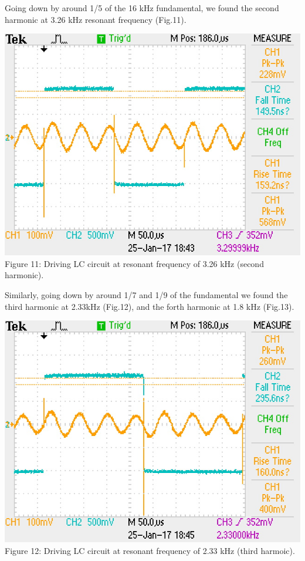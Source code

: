 \documentclass[]{article}
\begin{document}
		Going down by around 1/5 of the 16 kHz fundamental, we found the second harmonic at 3.26 kHz resonant frequency (Fig.11).
			\begin{center}
				\includegraphics[scale=0.8]{e_33hz}\\
				Figure 11: Driving LC circuit at resonant frequency of 3.26 kHz (second harmonic).
			\end{center}
		Similarly, going down by around 1/7 and 1/9 of the fundamental we found the third harmonic at 2.33kHz (Fig.12), and the forth harmonic at 1.8 kHz (Fig.13). 
		\begin{center}
			\includegraphics[scale=0.8]{e_233hz}\\
			Figure 12: Driving LC circuit at resonant frequency of 2.33 kHz (third harmoic).
		\end{center}
\end{document}
